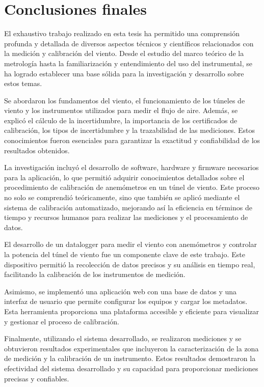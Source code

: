 \section{Conclusiones finales}
El exhaustivo trabajo realizado en esta tesis ha permitido una comprensión profunda y detallada de diversos aspectos técnicos y científicos relacionados con la medición y calibración del viento. Desde el estudio del marco teórico de la metrología hasta la familiarización y entendimiento del uso del instrumental, se ha logrado establecer una base sólida para la investigación y desarrollo sobre estos temas.

Se abordaron los fundamentos del viento, el funcionamiento de los túneles de viento y los instrumentos utilizados para medir el flujo de aire. Además, se explicó el cálculo de la incertidumbre, la importancia de los certificados de calibración, los tipos de incertidumbre y la trazabilidad de las mediciones. Estos conocimientos fueron esenciales para garantizar la exactitud y confiabilidad de los resultados obtenidos.

La investigación incluyó el desarrollo de software, hardware y firmware necesarios para la aplicación, lo que permitió adquirir conocimientos detallados sobre el procedimiento de calibración de anemómetros en un túnel de viento. Este proceso no solo se comprendió teóricamente, sino que también se aplicó mediante el sistema de calibración automatizado, mejorando así la eficiencia en términos de tiempo y recursos humanos para realizar las mediciones y el procesamiento de datos.

El desarrollo de un datalogger para medir el viento con anemómetros y controlar la potencia del túnel de viento fue un componente clave de este trabajo. Este dispositivo permitió la recolección de datos precisos y su análisis en tiempo real, facilitando la calibración de los instrumentos de medición.

Asimismo, se implementó una aplicación web con una base de datos y una interfaz de usuario que permite configurar los equipos y cargar los metadatos. Esta herramienta proporciona una plataforma accesible y eficiente para visualizar y gestionar el proceso de calibración.

Finalmente, utilizando el sistema desarrollado, se realizaron mediciones y se obtuvieron resultados experimentales que incluyeron la caracterización de la zona de medición y la calibración de un instrumento. Estos resultados demostraron la efectividad del sistema desarrollado y su capacidad para proporcionar mediciones precisas y confiables.

